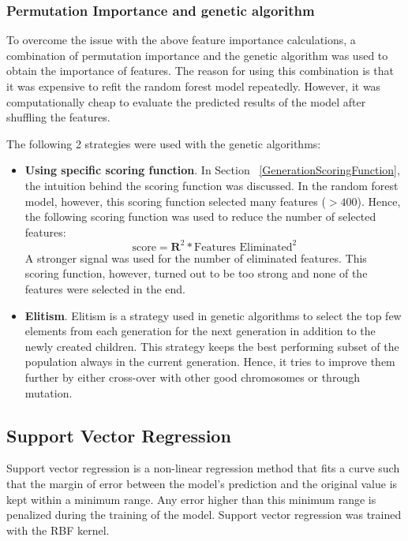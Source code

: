 \documentclass[11pt]{article}
\begin{document}
\subsubsection{Permutation Importance and genetic algorithm}
To overcome the issue with the above feature importance calculations, a combination of permutation importance and the genetic algorithm was used to obtain the importance of features.
The reason for using this combination is that it was expensive to refit the random forest model repeatedly. However, it was computationally cheap to evaluate the predicted results of the model after shuffling the features.

The following 2 strategies were used with the genetic algorithms:
\begin{itemize}
\item \textbf{Using specific scoring function}.  In Section ~\ref{GenerationScoringFunction},  the intuition behind the scoring function was discussed.
In the random forest model,  however,  this scoring function selected many features ($> 400$). Hence, the following scoring function was used to reduce the number of selected features:
$$
\textrm{score} = \mathbf{R}^2 * \textrm{Features Eliminated}^2
$$
A stronger signal was used for the number of eliminated features. This scoring function, however,  turned out to be too strong and none of the features were selected in the end.
\item \textbf{Elitism}.  Elitism is a strategy used in genetic algorithms to select the top few elements from each generation for the next generation in addition to the newly created children. This strategy keeps the best performing subset of the population always in the current generation. Hence, it tries to improve them further by either cross-over with other good chromosomes or through mutation.
\end{itemize}


\subsection{Support Vector Regression}
Support vector regression is a non-linear regression method that fits a curve such that the margin of error between the model's prediction and the original value is kept within a minimum range.
Any error higher than this minimum range is penalized during the training of the model.
Support vector regression was trained with the RBF kernel.
\end{document}
